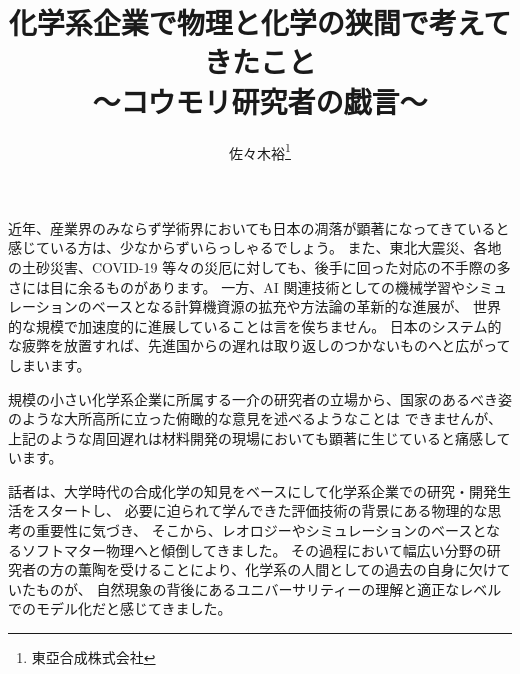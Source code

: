 \documentclass[uplatex,a4paper, 11pt]{jsarticle}
\title{化学系企業で物理と化学の狭間で考えてきたこと\\ \Large{～コウモリ研究者の戯言～}}
\author{佐々木裕\thanks{東亞合成株式会社}}
\date{}%
\begin{document}
\maketitle
\vspace{-3mm}

近年、産業界のみならず学術界においても日本の凋落が顕著になってきていると感じている方は、少なからずいらっしゃるでしょう。
また、東北大震災、各地の土砂災害、COVID-19 等々の災厄に対しても、後手に回った対応の不手際の多さには目に余るものがあります。
一方、AI 関連技術としての機械学習やシミュレーションのベースとなる計算機資源の拡充や方法論の革新的な進展が、
世界的な規模で加速度的に進展していることは言を俟ちません。
日本のシステム的な疲弊を放置すれば、先進国からの遅れは取り返しのつかないものへと広がってしまいます。

規模の小さい化学系企業に所属する一介の研究者の立場から、国家のあるべき姿のような大所高所に立った俯瞰的な意見を述べるようなことは
できませんが、上記のような周回遅れは材料開発の現場においても顕著に生じていると痛感しています。

話者は、大学時代の合成化学の知見をベースにして化学系企業での研究・開発生活をスタートし、
必要に迫られて学んできた評価技術の背景にある物理的な思考の重要性に気づき、
そこから、レオロジーやシミュレーションのベースとなるソフトマター物理へと傾倒してきました。
その過程において幅広い分野の研究者の方の薫陶を受けることにより、化学系の人間としての過去の自身に欠けていたものが、
自然現象の背後にあるユニバーサリティーの理解と適正なレベルでのモデル化だと感じてきました。
\end{document}
